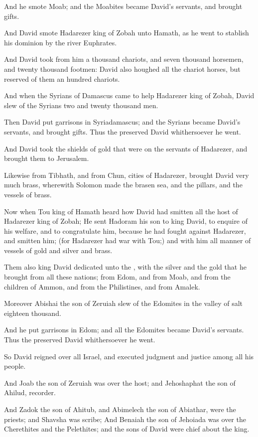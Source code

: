 \Verse And he smote Moab; and the Moabites became David's servants, and brought gifts.

\Verse And David smote Hadarezer king of Zobah unto Hamath, as he went to stablish his dominion by the river Euphrates.

\Verse And David took from him a thousand chariots, and seven thousand horsemen, and twenty thousand footmen: David also houghed all the chariot horses, but reserved of them an hundred chariots.

\Verse And when the Syrians of Damascus came to help Hadarezer king of Zobah, David slew of the Syrians two and twenty thousand men.

\Verse Then David put garrisons in Syriadamascus; and the Syrians became David's servants, and brought gifts. Thus the \LORD preserved David whithersoever he went.

\Verse And David took the shields of gold that were on the servants of Hadarezer, and brought them to Jerusalem.

\Verse Likewise from Tibhath, and from Chun, cities of Hadarezer, brought David very much brass, wherewith Solomon made the brasen sea, and the pillars, and the vessels of brass.

\Verse Now when Tou king of Hamath heard how David had smitten all the host of Hadarezer king of Zobah; \Verse He sent Hadoram his son to king David, to enquire of his welfare, and to congratulate him, because he had fought against Hadarezer, and smitten him; (for Hadarezer had war with Tou;) and with him all manner of vessels of gold and silver and brass.

\Verse Them also king David dedicated unto the \LORD, with the silver and the gold that he brought from all these nations; from Edom, and from Moab, and from the children of Ammon, and from the Philistines, and from Amalek.

\Verse Moreover Abishai the son of Zeruiah slew of the Edomites in the valley of salt eighteen thousand.

\Verse And he put garrisons in Edom; and all the Edomites became David's servants. Thus the \LORD preserved David whithersoever he went.

\Verse So David reigned over all Israel, and executed judgment and justice among all his people.

\Verse And Joab the son of Zeruiah was over the host; and Jehoshaphat the son of Ahilud, recorder.

\Verse And Zadok the son of Ahitub, and Abimelech the son of Abiathar, were the priests; and Shavsha was scribe; \Verse And Benaiah the son of Jehoiada was over the Cherethites and the Pelethites; and the sons of David were chief about the king.


